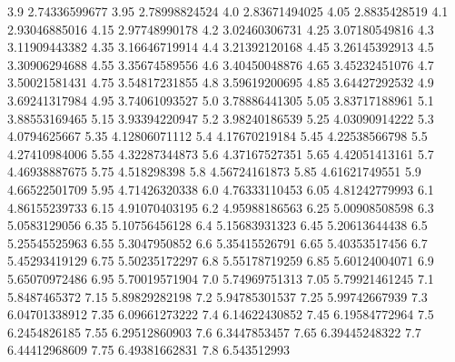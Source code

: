             3.9    2.74336599677
           3.95    2.78998824524
            4.0    2.83671494025
           4.05     2.8835428519
            4.1    2.93046885016
           4.15    2.97748990178
            4.2    3.02460306731
           4.25    3.07180549816
            4.3    3.11909443382
           4.35    3.16646719914
            4.4    3.21392120168
           4.45    3.26145392913
            4.5    3.30906294688
           4.55    3.35674589556
            4.6    3.40450048876
           4.65    3.45232451076
            4.7    3.50021581431
           4.75    3.54817231855
            4.8    3.59619200695
           4.85    3.64427292532
            4.9    3.69241317984
           4.95    3.74061093527
            5.0    3.78886441305
           5.05    3.83717188961
            5.1    3.88553169465
           5.15    3.93394220947
            5.2    3.98240186539
           5.25    4.03090914222
            5.3     4.0794625667
           5.35    4.12806071112
            5.4    4.17670219184
           5.45    4.22538566798
            5.5    4.27410984006
           5.55    4.32287344873
            5.6    4.37167527351
           5.65    4.42051413161
            5.7    4.46938887675
           5.75      4.518298398
            5.8    4.56724161873
           5.85    4.61621749551
            5.9    4.66522501709
           5.95    4.71426320338
            6.0    4.76333110453
           6.05    4.81242779993
            6.1    4.86155239733
           6.15    4.91070403195
            6.2    4.95988186563
           6.25    5.00908508598
            6.3     5.0583129056
           6.35    5.10756456128
            6.4    5.15683931323
           6.45    5.20613644438
            6.5    5.25545525963
           6.55     5.3047950852
            6.6    5.35415526791
           6.65    5.40353517456
            6.7    5.45293419129
           6.75    5.50235172297
            6.8    5.55178719259
           6.85    5.60124004071
            6.9    5.65070972486
           6.95    5.70019571904
            7.0    5.74969751313
           7.05    5.79921461245
            7.1     5.8487465372
           7.15    5.89829282198
            7.2    5.94785301537
           7.25    5.99742667939
            7.3    6.04701338912
           7.35    6.09661273222
            7.4    6.14622430852
           7.45    6.19584772964
            7.5     6.2454826185
           7.55    6.29512860903
            7.6     6.3447853457
           7.65    6.39445248322
            7.7    6.44412968609
           7.75    6.49381662831
            7.8      6.543512993
